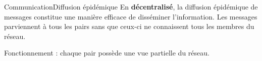 \begin{frame}{Communication}{Diffusion épidémique}
  En \textbf{décentralisé}, la diffusion épidémique de messages constitue une
  manière efficace de disséminer l'information. Les messages parviennent à tous
  les pairs sans que ceux-ci ne connaissent tous les membres du réseau.

  \vspace{0.5cm}

  Fonctionnement : chaque pair possède une vue partielle du réseau.
  \begin{enumerate}
  \end{enumerate}

  \begin{minipage}{0.45\textwidth}
    \begin{center}
      
    \end{center}
  \end{minipage}
  \hfill
  \begin{minipage}{0.53\textwidth}
    \large
    \begin{itemize}
    \end{itemize}
  \end{minipage}

\end{frame}


  

